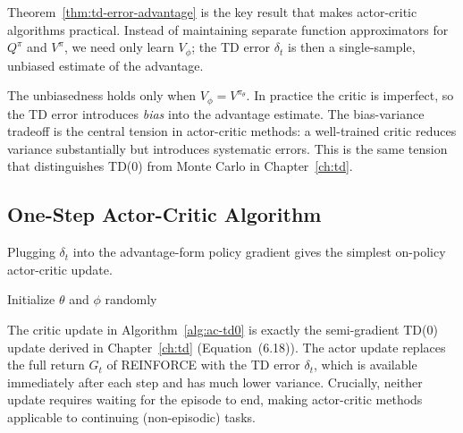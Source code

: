 Theorem~\ref{thm:td-error-advantage} is the key result that makes
actor-critic algorithms practical.  Instead of maintaining separate
function approximators for $Q^\pi$ and $V^\pi$, we need only learn $V_\phi$;
the TD error $\delta_t$ is then a single-sample, unbiased estimate of the
advantage.

\begin{remark}
The unbiasedness holds only when $V_\phi = V^{\pi_\theta}$.  In practice the
critic is imperfect, so the TD error introduces \emph{bias} into the
advantage estimate.  The bias-variance tradeoff is the central tension in
actor-critic methods: a well-trained critic reduces variance substantially
but introduces systematic errors.  This is the same tension that
distinguishes TD(0) from Monte Carlo in Chapter~\ref{ch:td}.
\end{remark}

\subsection{One-Step Actor-Critic Algorithm}

Plugging $\delta_t$ into the advantage-form policy gradient
gives the simplest on-policy actor-critic update.

\begin{algorithm}[ht]
\caption{One-Step On-Policy Actor-Critic (TD(0) Critic)}
\label{alg:ac-td0}
\DontPrintSemicolon
{}
Initialize $\theta$ and $\phi$ randomly\;
\end{algorithm}

The critic update in Algorithm~\ref{alg:ac-td0} is exactly the semi-gradient
TD(0) update derived in Chapter~\ref{ch:td} (Equation~(6.18)).  The actor
update replaces the full return $G_t$ of REINFORCE with the TD error
$\delta_t$, which is available immediately after each step and has much lower
variance.  Crucially, neither update requires waiting for the episode to end,
making actor-critic methods applicable to continuing (non-episodic) tasks.

